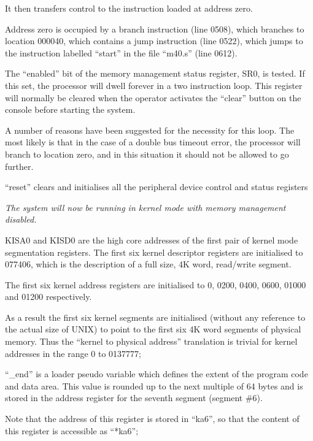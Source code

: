 It then transfers control to the
instruction loaded at address zero.

Address zero is occupied by a branch
instruction (line 0508), which branches
to location 000040, which contains a
jump instruction (line 0522), which
jumps to the instruction labelled
``start'' in the file ``m40.s'' (line
0612).


\bd
\item[0613:] The ``enabled'' bit of the memory
 management status register, SR0,
 is tested. If this set, the processor will dwell forever in a
 two instruction loop. This register will normally be cleared when
 the operator activates the
 ``clear'' button on the console
 before starting the system.

A number of reasons have been
suggested for the necessity for
this loop. The most likely is
that in the case of a double bus
timeout error, the processor will
branch to location zero, and in
this situation it should not be
allowed to go further.

\item[0615:] ``reset'' clears and initialises
 all the peripheral device control
 and status registers

{\it The system will now be running in
kernel mode with memory management
disabled.}

\item[0619:] KISA0 and KISD0 are the high core
 addresses of the first pair of
 kernel mode segmentation registers. The first six kernel
 descriptor registers are initialised to 077406, which is the
 description of a full size, 4K
 word, read/write segment.

The first six kernel address
registers are initialised to 0,
0200, 0400, 0600, 01000 and 01200
respectively.

As a result the first six kernel
segments are initialised (without
any reference to the actual size
of UNIX) to point to the first
six 4K word segments of physical
memory. Thus the ``kernel to physical address'' translation is
trivial for kernel addresses in
the range 0 to 0137777;

\item[0632:] ``\_end'' is a loader pseudo variable which defines the extent of
 the program code and data area.
 This value is rounded up to the
 next multiple of 64 bytes and is
 stored in the address register
 for the seventh segment (segment
 \#6).

Note that the address of this
register is stored in ``ka6'', so
that the content of this register
is accessible as ``*ka6'';

